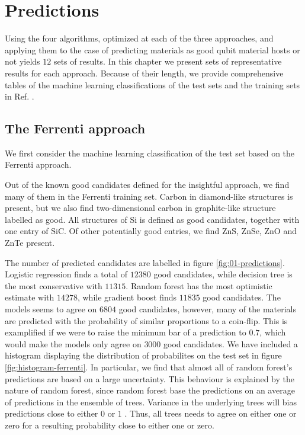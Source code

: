 \chapter{Predictions}

Using the four algorithms, optimized at each of the three approaches, and applying them to the case of predicting materials as good qubit material hosts or not yields $12$ sets of results. In this chapter we present sets of representative results for each approach. Because of their length, we provide comprehensive tables of the machine learning classifications of the test sets and the training sets in Ref. \cite{Ohebbi2021}.

\section{The Ferrenti approach}

We first consider the machine learning classification of the test set based on the Ferrenti approach.

Out of the known good candidates defined for the insightful approach, we find many of them in the Ferrenti training set. Carbon in diamond-like structures is present, but we also find two-dimensional carbon in graphite-like structure labelled as good. All structures of Si is defined as good candidates, together with one entry of SiC. Of other potentially good entries, we find ZnS, ZnSe, ZnO and ZnTe present.



The number of predicted candidates are labelled in figure \ref{fig:01-predictions}. Logistic regression finds a total of $12380$ good candidates, while decision tree is the most conservative with $11315$. Random forest has the most optimistic estimate with $14278$, while gradient boost finds $11835$ good candidates. The models seems to agree on $6804$ good candidates, however, many of the materials are predicted with the probability of similar proportions to a coin-flip. This is examplified if we were to raise the minimum bar of a prediction to $0.7$, which would make the models only agree on $3000$ good candidates. We have included a histogram displaying the distribution of probabilites on the test set in figure \ref{fig:histogram-ferrenti}. In particular, we find that almost all of random forest's predictions are based on a large uncertainty. This behaviour is explained by the nature of random forest, since random forest base the predictions on an average of predictions in the ensemble of trees. Variance in the underlying trees will bias predictions close to either $0$ or $1$ \cite{NiculescuMizil2005}. Thus, all trees needs to agree on either one or zero for a resulting probability close to either one or zero.

